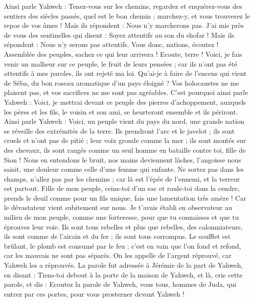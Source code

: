 \begin{multicols}{2}
Ainsi parle Yahweh : Tenez-vous sur les chemins, regardez et enquérez-vous des sentiers des siècles passés, quel est le bon chemin ; marchez-y, et vous trouverez le repos de vos âmes ! Mais ils répondent : Nous n'y marcherons pas.
J'ai mis près de vous des sentinelles qui disent : Soyez attentifs au son du shofar ! Mais ils répondent : Nous n'y serons pas attentifs.
Vous donc, nations, écoutez ! Assemblée des peuples, sachez ce qui leur arrivera !
Ecoute, terre ! Voici, je fais venir un malheur sur ce peuple, le fruit de leurs pensées ; car ils n'ont pas été attentifs à mes paroles, ils ont rejeté ma loi.
Qu’ai-je à faire de l'encens qui vient de Séba, du bon roseau aromatique d’un pays éloigné ? Vos holocaustes ne me plaisent pas, et vos sacrifices ne me sont pas agréables.
C'est pourquoi ainsi parle Yahweh : Voici, je mettrai devant ce peuple des pierres d'achoppement, auxquels les pères et les fils, le voisin et son ami, se heurteront ensemble et ils périront.
Ainsi parle Yahweh : Voici, un peuple vient du pays du nord, une grande nation se réveille des extrémités de la terre.
Ils prendront l'arc et le javelot ; ils sont cruels et n'ont pas de pitié ; leur voix gronde comme la mer ; ils sont montés sur des chevaux, ils sont rangés comme un seul homme en bataille contre toi, fille de Sion !
Nous en entendons le bruit, nos mains deviennent lâches, l'angoisse nous saisit, une douleur comme celle d’une femme qui enfante.
Ne sortez pas dans les champs, n'allez pas par les chemins ; car là est l'épée de l'ennemi, et la terreur est partout.
Fille de mon peuple, ceins-toi d'un sac et roule-toi dans la cendre, prends le deuil comme pour un fils unique, fais une lamentation très amère ! Car le dévastateur vient subitement sur nous.
Je t'avais établi en observateur au milieu de mon peuple, comme une forteresse, pour que tu connaisses et que tu éprouves leur voie.
Ils sont tous rebelles et plus que rebelles, des calomniateurs, ils sont comme de l'airain et du fer ; ils sont tous corrompus.
Le soufflet est brûlant, le plomb est consumé par le feu ; c’est en vain que l’on fond et refond, car les mauvais ne sont pas séparés.
On les appelle de l’argent réprouvé, car Yahweh les a réprouvés.
\VerseOne{}La parole fut adressée à Jérémie de la part de Yahweh, en disant :
Tiens-toi debout à la porte de la maison de Yahweh, et là, crie cette parole, et dis : Ecoutez la parole de Yahweh, vous tous, hommes de Juda, qui entrez par ces portes, pour vous prosterner devant Yahweh !

\end{multicols}
